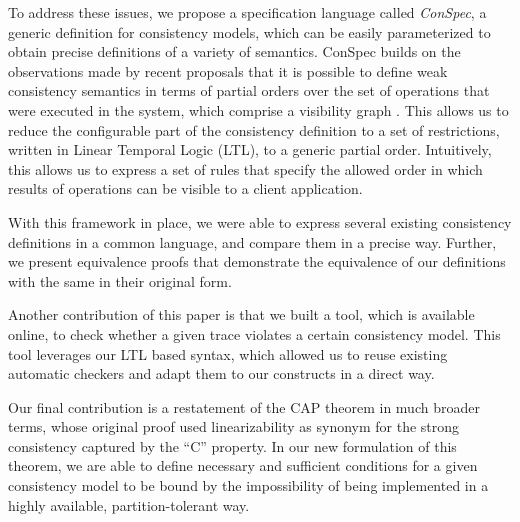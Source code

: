 \documentclass[journal,compsoc]{IEEEtran}
\begin{document}
To address these issues, we propose a specification language called
\emph{ConSpec}, a generic definition for consistency models, which can
be easily parameterized to obtain precise definitions of a variety of
semantics. ConSpec builds on the observations made by recent proposals
that it is possible to define weak consistency semantics in terms of
partial orders over the set of operations that were executed in the
system, which comprise a visibility graph 
\cite{Li:2012:MGS:2387880.2387906, Gotsman:2016:CIS:2837614.2837625, cheng-papoc}. This allows us to reduce
the configurable part of the consistency definition to a set of restrictions,
written in Linear Temporal Logic (LTL), to a generic partial order.
Intuitively, this allows us to express a set of rules that specify the allowed order in which results of operations can be visible to a client application.  


With this framework in place, we were able to express several existing
consistency definitions in a common language, and compare them in a precise
way. Further, we present equivalence proofs that demonstrate the equivalence of our definitions with the same in their original form. %
 
Another contribution of this paper is that we built a tool, which is available online, to check whether a given trace violates a certain consistency model. This tool leverages our LTL based syntax, which allowed us to reuse existing automatic checkers and adapt them to our constructs in a direct way.

Our final contribution is a restatement of the CAP theorem \cite{brew:cap, Gilbert:2002:BCF:564585.564601}  in much broader terms, whose original proof used linearizability as synonym for the strong consistency captured by the ``C'' property. In our new formulation of this theorem, we are able to define necessary and sufficient conditions for a given consistency model to be bound by the impossibility of being implemented in a highly available, partition-tolerant way.
\end{document}
